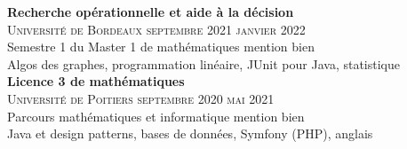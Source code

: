 \documentclass[oneside]{article}
\begin{document}
{\begin{minipage}[t][\dimexpr\textheight-2\fboxrule-2\fboxsep\relax][t]{\dimexpr0.6\textwidth-2\fboxrule-2\fboxsep\relax}
    
    {\large \textbf{Recherche opérationnelle et aide à la décision}} \\
    {\scshape{}\selectfont Université de Bordeaux \qquad septembre 2021 \textendash{} janvier 2022} \\
    {Semestre 1 du Master 1 de mathématiques \textendash{} mention bien} \\[1ex]
    {\footnotesize Algos des graphes, programmation linéaire, JUnit pour Java, statistique} \\[2ex]
    
    {\large \textbf{Licence 3 de mathématiques}} \\
    {\scshape{}\selectfont Université de Poitiers \qquad septembre 2020 \textendash{} mai 2021} \\
    {Parcours mathématiques et informatique \textendash{} mention bien} \\[1ex]
    {\footnotesize Java et design patterns, bases de données, Symfony (PHP), anglais} \\
    



    

\end{minipage}}
\end{document}
